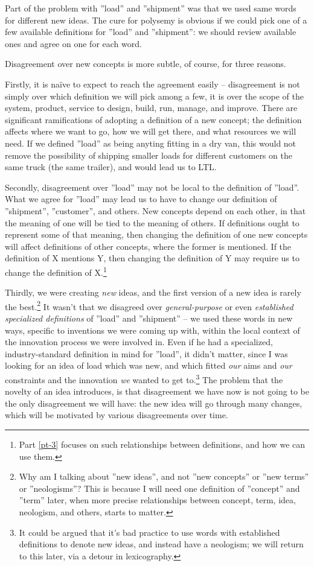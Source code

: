 \documentclass[graybox,envcountchap,sectrefs]{svmono}
\begin{document}
Part of the problem with ''load'' and ''shipment'' was that we used same words for different new ideas. The cure for polysemy is obvious if we could pick one of a few available definitions for ''load'' and ''shipment'': we should review available ones and agree on one for each word. 

Disagreement over new concepts is more subtle, of course, for three reasons. 

Firstly, it is na\"{i}ve to expect to reach the agreement easily -- disagreement is not simply over which definition we will pick among a few, it is over the scope of the system, product, service to design, build, run, manage, and improve. There are significant ramifications of adopting a definition of a new concept; the definition affects where we want to go, how we will get there, and what resources we will need. If we defined ''load'' as being anyting fitting in a dry van, this would not remove the possibility of shipping smaller loads for different customers on the same truck (the same trailer), and would lead us to LTL. 

Secondly, disagreement over ''load'' may not be local to the definition of ''load''. What we agree for ''load'' may lead us to have to change our definition of ''shipment'', ''customer'', and others. New concepts depend on each other, in that the meaning of one will be tied to the meaning of others. If definitions ought to represent some of that meaning, then changing the definition of one new concepts will affect definitions of other concepts, where the former is mentioned. If the definition of X mentions Y, then changing the definition of Y may require us to change the definition of X.\footnote{Part \ref{pt-3} focuses on such relationships between definitions, and how we can use them.}

Thirdly, we were creating \textit{new} ideas, and the first version of a new idea is rarely the best.\footnote{Why am I talking about ''new ideas'', and not ''new concepts'' or ''new terms'' or ''neologisms''? This is because I will need one definition of ''concept'' and ''term'' later, when more precise relationships between concept, term, idea, neologism, and others, starts to matter.} It wasn't that we disagreed over \textit{general-purpose} or even \textit{established specialized definitions} of ''load'' and ''shipment'' -- we used these words in new ways, specific to inventions we were coming up with, within the local context of the innovation process we were involved in. Even if he had a specialized, industry-standard definition in mind for ''load'', it didn't matter, since I was looking for an idea of load which was new, and which fitted \textit{our} aims and \textit{our} constraints and the innovation \textit{we} wanted to get to.\footnote{It could be argued that it's bad practice to use words with established definitions to denote new ideas, and instead have a neologism; we will return to this later, via a detour in lexicography.} The problem that the novelty of an idea introduces, is that disagreement we have now is not going to be the only disagreement we will have: the new idea will go through many changes, which will be motivated by various disagreements over time. 
\end{document}
